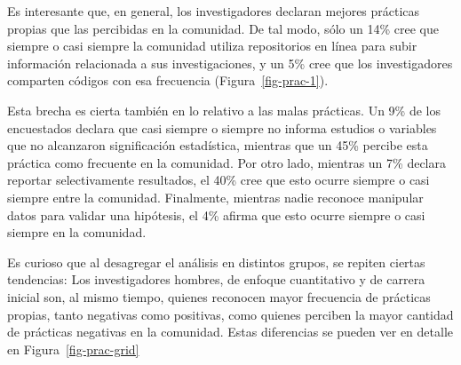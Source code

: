 \documentclass[
  letterpaper,
  DIV=11,
  numbers=noendperiod]{scrreprt}
\begin{document}
Es interesante que, en general, los investigadores declaran mejores
prácticas propias que las percibidas en la comunidad. De tal modo, sólo
un 14\% cree que siempre o casi siempre la comunidad utiliza
repositorios en línea para subir información relacionada a sus
investigaciones, y un 5\% cree que los investigadores comparten códigos
con esa frecuencia (Figura~\ref{fig-prac-1}).

Esta brecha es cierta también en lo relativo a las malas prácticas. Un
9\% de los encuestados declara que casi siempre o siempre no informa
estudios o variables que no alcanzaron significación estadística,
mientras que un 45\% percibe esta práctica como frecuente en la
comunidad. Por otro lado, mientras un 7\% declara reportar
selectivamente resultados, el 40\% cree que esto ocurre siempre o casi
siempre entre la comunidad. Finalmente, mientras nadie reconoce
manipular datos para validar una hipótesis, el 4\% afirma que esto
ocurre siempre o casi siempre en la comunidad.

Es curioso que al desagregar el análisis en distintos grupos, se repiten
ciertas tendencias: Los investigadores hombres, de enfoque cuantitativo
y de carrera inicial son, al mismo tiempo, quienes reconocen mayor
frecuencia de prácticas propias, tanto negativas como positivas, como
quienes perciben la mayor cantidad de prácticas negativas en la
comunidad. Estas diferencias se pueden ver en detalle en
Figura~\ref{fig-prac-grid}
\end{document}
